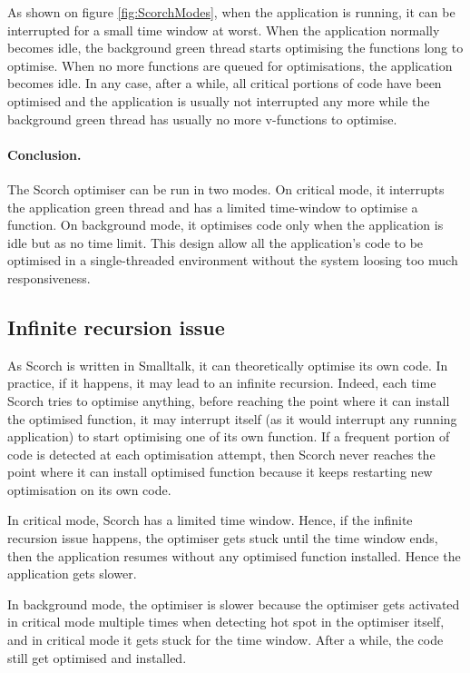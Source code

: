 \documentclass[a4paper,12pt,twoside]{../includes/ThesisStyle}
\begin{document}
As shown on figure \ref{fig:ScorchModes}, when the application is running, it can be interrupted for a small time window at worst. When the application normally becomes idle, the background green thread starts optimising the functions long to optimise. When no more functions are queued for optimisations, the application becomes idle. In any case, after a while, all critical portions of code have been optimised and the application is usually not interrupted any more while the background green thread has usually no more v-functions to optimise.

\paragraph{Conclusion.} The Scorch optimiser can be run in two modes. On critical mode, it interrupts the application green thread and has a limited time-window to optimise a function. On background mode, it optimises code only when the application is idle but as no time limit. This design allow all the application's code to be optimised in a single-threaded environment without the system loosing too much responsiveness.

\subsection{Infinite recursion issue}

As Scorch is written in Smalltalk, it can theoretically optimise its own code. In practice, if it happens, it may lead to an infinite recursion. Indeed, each time Scorch tries to optimise anything, before reaching the point where it can install the optimised function, it may interrupt itself (as it would interrupt any running application) to start optimising one of its own function. If a frequent portion of code is detected at each optimisation attempt, then Scorch never reaches the point where it can install optimised function because it keeps restarting new optimisation on its own code.

In critical mode, Scorch has a limited time window. Hence, if the infinite recursion issue happens, the optimiser gets stuck until the time window ends, then the application resumes without any optimised function installed. Hence the application gets slower.

In background mode, the optimiser is slower because the optimiser gets activated in critical mode multiple times when detecting hot spot in the optimiser itself, and in critical mode it gets stuck for the time window. After a while, the code still get optimised and installed. 
\end{document}
